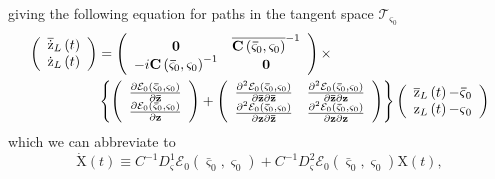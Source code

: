 \documentclass[aps,preprint]{revtex4}%
\begin{document}
giving the following equation for paths in the tangent space $\mathcal{T}%
_{\mathbf{\varsigma}_{0}}$
\begin{align}
\left(
\begin{array}
[c]{c}%
\overline{\mathrm{\dot{z}}}_{L}\left(  t\right) \\
\mathrm{\dot{z}}_{L}\left(  t\right)
\end{array}
\right)   &  =\left(
\begin{array}
[c]{cc}%
\mathbf{0} & \overline{\mathbf{C}\left(  \mathbf{\bar{\varsigma}}%
_{0},\mathbf{\varsigma}_{0}\right)  }^{-1}\\
-i\mathbf{C}\left(  \mathbf{\bar{\varsigma}}_{0},\mathbf{\varsigma}%
_{0}\right)  ^{-1} & \mathbf{0}%
\end{array}
\right)  \times\nonumber\\
&  \left\{  \left(
\begin{array}
[c]{c}%
\frac{\partial\mathcal{E}_{0}\left(  \mathbf{\bar{\varsigma}}_{0}%
,\mathbf{\varsigma}_{0}\right)  }{\partial\mathbf{\bar{z}}}\\
\frac{\partial\mathcal{E}_{0}\left(  \mathbf{\bar{\varsigma}}_{0}%
,\mathbf{\varsigma}_{0}\right)  }{\partial\mathbf{z}}%
\end{array}
\right)  +\left(
\begin{array}
[c]{cc}%
\frac{\partial^{2}\mathcal{E}_{0}\left(  \mathbf{\bar{\varsigma}}%
_{0},\mathbf{\varsigma}_{0}\right)  }{\partial\mathbf{\bar{z}}\partial
\mathbf{\bar{z}}} & \frac{\partial^{2}\mathcal{E}_{0}\left(  \mathbf{\bar
{\varsigma}}_{0},\mathbf{\varsigma}_{0}\right)  }{\partial\mathbf{\bar{z}%
}\partial\mathbf{z}}\\
\frac{\partial^{2}\mathcal{E}_{0}\left(  \mathbf{\bar{\varsigma}}%
_{0},\mathbf{\varsigma}_{0}\right)  }{\partial\mathbf{z}\partial
\mathbf{\bar{z}}} & \frac{\partial^{2}\mathcal{E}_{0}\left(  \mathbf{\bar
{\varsigma}}_{0},\mathbf{\varsigma}_{0}\right)  }{\partial\mathbf{z}%
\partial\mathbf{z}}%
\end{array}
\right)  \right\}  \left(
\begin{array}
[c]{c}%
\overline{\mathrm{z}}_{L}\left(  t\right)  \mathbf{-\bar{\varsigma}}_{0}\\
\mathrm{z}_{L}\left(  t\right)  \mathbf{-\varsigma}_{0}%
\end{array}
\right)
\end{align}
which we can abbreviate to
\begin{equation}
\mathrm{\dot{X}}\left(  t\right)  \equiv C^{-1}D_{\mathbf{\varsigma}}%
^{1}\mathcal{E}_{0}\left(  \mathbf{\bar{\varsigma}}_{0},\mathbf{\varsigma}%
_{0}\right)  +C^{-1}D_{\mathbf{\varsigma}}^{2}\mathcal{E}_{0}\left(
\mathbf{\bar{\varsigma}}_{0},\mathbf{\varsigma}_{0}\right)  \mathrm{X}\left(
t\right)  ,
\end{equation}
\end{document}
